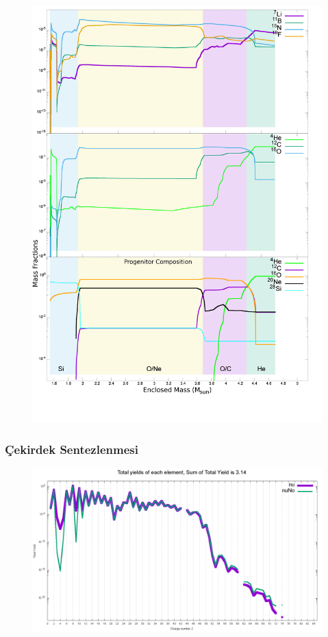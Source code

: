 \documentclass[10pt]{beamer}
\begin{document}
\begin{frame}
\begin{minipage}{0.45\textwidth}
\begin{figure}[hbt!]
            \includegraphics[width=\textwidth]{fig/abundadecay_he4li7b11c12n15o16f19_hor.png}
        \end{figure}
    \end{minipage}
\end{frame}

\begin{frame}
    \frametitle{Çekirdek Sentezlenmesi}
    \begin{figure}[hbt!]
        \centering
        \includegraphics[width=\textwidth]{fig/abundadecay_Z_TotalYields_nu_nuNo.png}
    \end{figure}
\end{frame}
\end{document}
